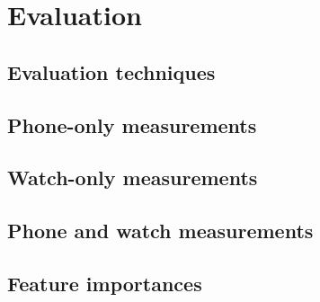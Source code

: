 \chapter{Evaluation}
  \section{Evaluation techniques}
  
  \section{Phone-only measurements}
  
  \section{Watch-only measurements}
  
  \section{Phone and watch measurements}
  
  \section{Feature importances}
